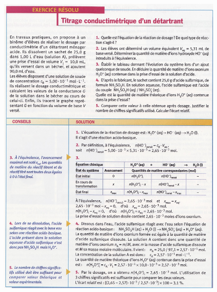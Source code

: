 \documentclass[11pt,a4paper]{article}
\begin{document}
\begin{figure}[h]
    \centering
    \includegraphics[width=\linewidth]{imgs/c1/xo3.jpg}
\end{figure} 
\end{document}
